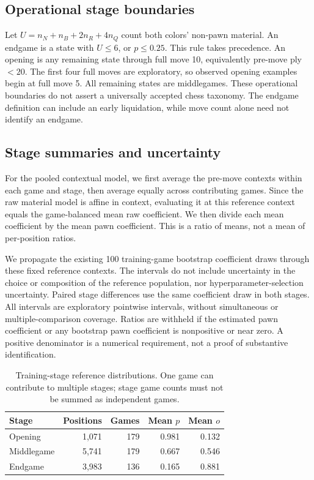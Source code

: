 \documentclass[11pt]{article}
\begin{document}
\subsection{Operational stage boundaries}
Let $U=n_N+n_B+2n_R+4n_Q$ count both colors' non-pawn material. An endgame is a state with $U\leq6$, or $p\leq0.25$. This rule takes precedence. An opening is any remaining state through full move 10, equivalently pre-move ply $<20$. The first four full moves are exploratory, so observed opening examples begin at full move 5. All remaining states are middlegames. These operational boundaries do not assert a universally accepted chess taxonomy. The endgame definition can include an early liquidation, while move count alone need not identify an endgame.

\subsection{Stage summaries and uncertainty}
For the pooled contextual model, we first average the pre-move contexts within each game and stage, then average equally across contributing games. Since the raw material model is affine in context, evaluating it at this reference context equals the game-balanced mean raw coefficient. We then divide each mean coefficient by the mean pawn coefficient. This is a ratio of means, not a mean of per-position ratios.

We propagate the existing 100 training-game bootstrap coefficient draws through these fixed reference contexts. The intervals do not include uncertainty in the choice or composition of the reference population, nor hyperparameter-selection uncertainty. Paired stage differences use the same coefficient draw in both stages. All intervals are exploratory pointwise intervals, without simultaneous or multiple-comparison coverage. Ratios are withheld if the estimated pawn coefficient or any bootstrap pawn coefficient is nonpositive or near zero. A positive denominator is a numerical requirement, not a proof of substantive identification.
\begin{table}[htbp]\centering
\small
\caption{Training-stage reference distributions. One game can contribute to multiple stages; stage game counts must not be summed as independent games.}\label{tab:coverage}
\begin{tabular}{lrrrr}
\toprule
Stage & Positions & Games & Mean $p$ & Mean $o$\\\midrule
Opening & 1,071 & 179 & 0.981 & 0.132\\
Middlegame & 5,741 & 179 & 0.667 & 0.546\\
Endgame & 3,983 & 136 & 0.165 & 0.881\\
\bottomrule\end{tabular}\end{table}
\end{document}
